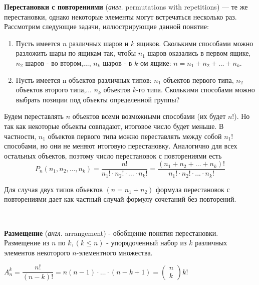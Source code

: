 \textbf{Перестановки с повторениями} (\textit{англ.} permutations with repetitions) — те же перестановки, однако некоторые элементы могут встречаться несколько раз. Рассмотрим следующие задачи, иллюстрирующие данной понятие:
\begin{enumerate}
	\item Пусть имеется $n$ различных шаров и $k$ ящиков. Сколькими способами можно разложить шары по ящикам так, чтобы $n_1$ шаров оказались в первом ящике, $n_2$ шаров - во втором,..., $n_k$ шаров - в $k$-ом ящике: $n = n_1 + n_2 + \dots + n_k$.
	\item Пусть имеется n объектов различных типов: $n_1$ объектов первого типа, $n_2$ объектов второго типа,... $n_k$ объектов $k$-го типа. Сколькими способами можно выбрать позиции под объекты определенной группы?
\end{enumerate}
Будем переставлять $n$ объектов всеми возможными способами (их будет $n!$). Но так как некоторые объекты совпадают, итоговое число будет меньше. В частности, $n_1$ объектов первого типа можно переставлять между собой $n_1!$ способами, но они не меняют итоговую перестановку. Аналогично для всех остальных объектов, поэтому число перестановок с повторениями есть
\[ P_n (n_1,n_2,...,n_k)=\frac{n!}{n_1! \cdot n_2!\cdot ... \cdot n_k!} = \frac{(n_1 + n_2 + \dots + n_k)!}{n_1! \cdot n_2!\cdot ... \cdot n_k!} \]
\begin{remark}
	Для случая двух типов объектов $(n=n_1+n_2)$ формула перестановок с повторениями дает как частный случай формулу сочетаний без повторений.
\end{remark}

~

\textbf{Размещение} (\textit{англ.} arrangement) - обобщение понятия перестановки. Размещение из $n$ по $k, (k \le n)$ - упорядоченный набор из $k$ различных элементов некоторого $n$-элементного множества.

\noindent $A_n^k = \dfrac{n!}{(n-k)!} = n(n-1) \cdot \dots \cdot (n-k+1) = \begin{pmatrix} n \\ k \end{pmatrix} k!$

